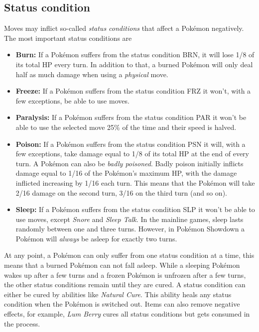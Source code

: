 \subsection{Status condition}
Moves may inflict so-called \textit{status conditions} that affect a Pokémon negatively.
The most important status conditions are
\begin{itemize}
	\item \textbf{Burn:} If a Pokémon suffers from the status condition \ac{BRN}, it will lose 1/8 of its
		total \ac{HP} every turn. In addition to that, a burned Pokémon will only deal half as much damage
		when using a \textit{physical} move.
	\item \textbf{Freeze:} If a Pokémon suffers from the status condition \ac{FRZ} it won't, with a few exceptions,
		be able to use moves. 
	\item \textbf{Paralysis:} If a Pokémon suffers from the status condition \ac{PAR} it won't be able to use 
		the selected move 25\% of the time and their speed is halved.
	\item \textbf{Poison:} If a Pokémon suffers from the status condition \ac{PSN} it will, with a few exceptions,
		take damage equal to 1/8 of its total \ac{HP} at the end of every turn. A Pokémon can also be 
		\textit{badly poisoned}. Badly poison initially inflicts damage equal to 1/16 of the Pokémon's maximum
		\ac{HP}, with the damage inflicted increasing by 1/16 each turn. This means that the Pokémon will
		take 2/16 damage on the second turn, 3/16 on the third turn (and so on).
	\item \textbf{Sleep:} If a Pokémon suffers from the status condition \ac{SLP} it won't be able to use moves,
		except \textit{Snore} and \textit{Sleep Talk}. In the mainline games, sleep lasts randomly between
		one and three turns. However, in Pokémon Showdown a Pokémon will \textit{always} be asleep for exactly
		two turns.
\end{itemize}

At any point, a Pokémon can only suffer from one status condition at a time, this means that a 
burned Pokémon can not fall asleep. While a sleeping Pokémon wakes up after a few turns and a 
frozen Pokémon is unfrozen after a few turns, the other status conditions remain until they are 
cured. A status condition can either be cured by abilities like \textit{Natural Cure}. This ability
heals any status condition when the Pokémon is switched out. Items can also remove negative effects,
for example, \textit{Lum Berry} cures all status conditions but gets consumed in the process.

